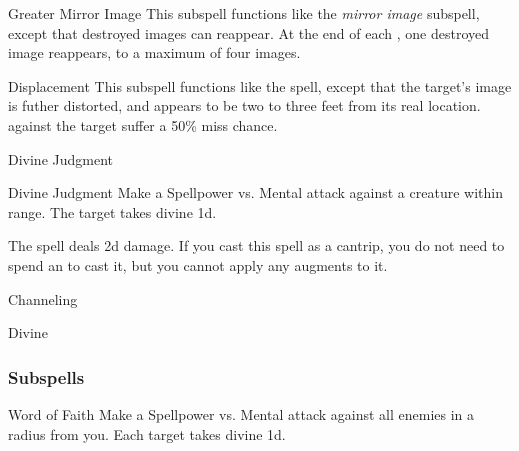 \begin{ability}[\nth{5}]{Greater Mirror Image}
This subspell functions like the \textit{mirror image} subspell, except that destroyed images can reappear.
At the end of each , one destroyed image reappears, to a maximum of four images.
\end{ability}
\vspace{0.25em}


\begin{ability}[\nth{7}]{Displacement}
This subspell functions like the  spell, except that the target's image is futher distorted, and appears to be two to three feet from its real location.
  against the target suffer a 50\% miss chance.
\end{ability}
\vspace{0.25em}

\newpage
\begin{spellsection}{Divine Judgment}

\begin{spellheader}
\end{spellheader}


\begin{ability}{Divine Judgment}
Make a Spellpower vs. Mental attack against a creature within \rngmed range.
\hit The target takes divine  \plus1d.
\end{ability}



 The spell deals \minus2d damage. If you cast this spell as a cantrip,
you do not need to spend an  to cast it,
but you cannot apply any augments to it.


 Channeling

 Divine
\end{spellsection}


\subsubsection{Subspells}


\begin{ability}[\nth{2}]{Word of Faith}
Make a Spellpower vs. Mental attack against all enemies in a \areamed radius from you.
\hit Each target takes divine  \minus1d.
\end{ability}
\vspace{0.25em}

